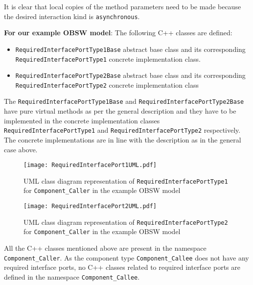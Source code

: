 It is clear that local copies of the method parameters need to be made because the desired interaction kind is \texttt{asynchronous}.             

\textbf{For our example OBSW model}: The following C++ classes are defined:
\begin{itemize}
\item \texttt{RequiredInterface\allowbreak PortType1Base} abstract base class and its corresponding \texttt{Required\allowbreak InterfacePort\allowbreak Type1} concrete implementation class.
\item \texttt{RequiredInterface\allowbreak PortType2Base} abstract base class and its corresponding \texttt{Required\allowbreak InterfacePort\allowbreak Type2} concrete implementation class
\end{itemize}

The \texttt{RequiredInterface\allowbreak PortType1Base} and \texttt{RequiredInterface\allowbreak PortType2Base} have pure virtual methods as per the general description and they have to be implemented in the concrete implementation classes \texttt{Required\allowbreak InterfacePort\allowbreak Type1} and \texttt{Required\allowbreak InterfacePort\allowbreak Type2} respectively. The concrete implementations are in line with the description as in the general case above.

\begin{figure}[h]
	\centering
	\texttt{[image: RequiredInterfacePort1UML.pdf]}
	\caption{UML class diagram representation of \texttt{Required\allowbreak InterfacePort\allowbreak Type1} for \texttt{Component\allowbreak\_Caller} in the example OBSW model}
	\label{fig: Required interface port1 UML}
\end{figure}

\begin{figure}[h]
	\centering
	\texttt{[image: RequiredInterfacePort2UML.pdf]}
	\caption{UML class diagram representation of \texttt{Required\allowbreak InterfacePort\allowbreak Type2} for \texttt{Component\allowbreak\_Caller} in the example OBSW model}
	\label{fig: Required interface port2 UML}
\end{figure}

All the C++ classes mentioned above are present in the namespace \texttt{Component\allowbreak\_Caller}. As the component type \texttt{Component\allowbreak\_Callee} does not have any required interface ports, no C++ classes related to required interface ports are defined in the namespace \texttt{Component\allowbreak\_Callee}. 

